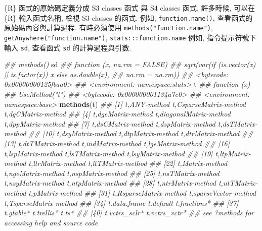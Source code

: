 \documentclass[
]{book}
\newenvironment{Shaded}{\begin{snugshade}}{\end{snugshade}}
\newcommand{\CommentTok}[1]{\textcolor[rgb]{0.56,0.35,0.01}{\textit{#1}}}
\newcommand{\KeywordTok}[1]{\textcolor[rgb]{0.13,0.29,0.53}{\textbf{#1}}}
\newcommand{\NormalTok}[1]{#1}
\begin{document}
\{R\} 函式的原始碼定義分成
S3 classes 函式 與 S4 classes 函式,
許多時候, 可以在 \{R\} 輸入函式名稱,
檢視 S3 classes 的函式.
例如,
\texttt{function.name()},
查看函式的原始碼內容與計算過程.
有時必須使用 \texttt{methods("function.name")},
\texttt{getAnywhere("function.name")},
\texttt{stats:::function.name}
例如,
指令提示符號下輸入 \texttt{sd},
查看函式 \texttt{sd} 的計算過程與引數.

\begin{Shaded}
\begin{Highlighting}[]
\CommentTok{\#\# methods()}
\NormalTok{sd}
\CommentTok{\#\# function (x, na.rm = FALSE) }
\CommentTok{\#\# sqrt(var(if (is.vector(x) || is.factor(x)) x else as.double(x), }
\CommentTok{\#\#     na.rm = na.rm))}
\CommentTok{\#\# \textless{}bytecode: 0x00000000125fbaa0\textgreater{}}
\CommentTok{\#\# \textless{}environment: namespace:stats\textgreater{}}
\NormalTok{t}
\CommentTok{\#\# function (x) }
\CommentTok{\#\# UseMethod("t")}
\CommentTok{\#\# \textless{}bytecode: 0x000000001134a7c0\textgreater{}}
\CommentTok{\#\# \textless{}environment: namespace:base\textgreater{}}
\KeywordTok{methods}\NormalTok{(t)}
\CommentTok{\#\#  [1] t,ANY{-}method            t,CsparseMatrix{-}method  t,dgCMatrix{-}method     }
\CommentTok{\#\#  [4] t,dgeMatrix{-}method      t,diagonalMatrix{-}method t,dppMatrix{-}method     }
\CommentTok{\#\#  [7] t,dsCMatrix{-}method      t,dspMatrix{-}method      t,dsTMatrix{-}method     }
\CommentTok{\#\# [10] t,dsyMatrix{-}method      t,dtpMatrix{-}method      t,dtrMatrix{-}method     }
\CommentTok{\#\# [13] t,dtTMatrix{-}method      t,indMatrix{-}method      t,lgeMatrix{-}method     }
\CommentTok{\#\# [16] t,lspMatrix{-}method      t,lsTMatrix{-}method      t,lsyMatrix{-}method     }
\CommentTok{\#\# [19] t,ltpMatrix{-}method      t,ltrMatrix{-}method      t,ltTMatrix{-}method     }
\CommentTok{\#\# [22] t,Matrix{-}method         t,ngeMatrix{-}method      t,nspMatrix{-}method     }
\CommentTok{\#\# [25] t,nsTMatrix{-}method      t,nsyMatrix{-}method      t,ntpMatrix{-}method     }
\CommentTok{\#\# [28] t,ntrMatrix{-}method      t,ntTMatrix{-}method      t,pMatrix{-}method       }
\CommentTok{\#\# [31] t,RsparseMatrix{-}method  t,sparseVector{-}method   t,TsparseMatrix{-}method }
\CommentTok{\#\# [34] t.data.frame            t.default               t.fractions*           }
\CommentTok{\#\# [37] t.gtable*               t.trellis*              t.ts*                  }
\CommentTok{\#\# [40] t.vctrs\_sclr*           t.vctrs\_vctr*          }
\CommentTok{\#\# see \textquotesingle{}?methods\textquotesingle{} for accessing help and source code}

\end{Highlighting}
\end{Shaded}
\end{document}
